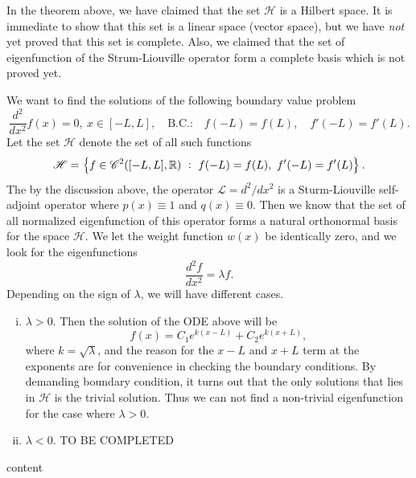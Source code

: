 \begin{beCareful}
	In the theorem above, we have claimed that the set $\mathscr{H}$ is a Hilbert space. It is immediate to show that this set is a linear space (vector space), but we have \emph{not} yet proved that this set is complete. Also, we claimed that the set of eigenfunction of the Strum-Liouville operator form a complete basis which is not proved yet.
\end{beCareful}

\begin{example}
	We want to find the solutions of the following boundary value problem
	\[ \frac{d^2}{dx^2} f(x) = 0, \ x\in [-L,L], \quad \text{B.C.:}\quad f(-L) = f(L), \quad f'(-L) = f'(L).  \]
	Let the set $\mathscr{H}$ denote the set of all such functions
	\[ \mathscr{H} = \left\{ f \in \mathscr{C}^2([-L,L],\mathbb{R})\ :\ f(-L)=f(L),\ f'(-L) = f'(L) \right\}. \]
	The by the discussion above, the operator $\mathcal{L} = d^2/dx^2$ is a Sturm-Liouville self-adjoint operator where $p(x) \equiv 1$ and $q(x) \equiv 0$. Then we know that the set of all normalized eigenfunction of this operator forms a natural orthonormal basis for the space $\mathscr{H}$.
	We let the weight function $w(x)$ be identically zero, and we look for the eigenfunctions
	\[ \frac{d^2 f}{dx^2} = \lambda f. \]
	Depending on the sign of $\lambda$, we will have different cases. 
	\begin{enumerate}[(i)]
		\item $\lambda>0$. Then the solution of the ODE above will be
		\[ f(x) = C_1 e^{k(x-L)} + C_2 e^{k(x+L)}, \]
		where $k  = \sqrt{\lambda}$, and the reason for the $x-L$ and $x+L$ term at the exponents are for convenience in checking the boundary conditions. By demanding boundary condition, it turns out that the only solutions that lies in $\mathscr{H}$ is the trivial solution. Thus we can not find a non-trivial eigenfunction for the case where $\lambda>0$. 
		\item $\lambda < 0$. TO BE  COMPLETED
		 
	\end{enumerate}
\end{example}
\begin{example}
	content
\end{example}
